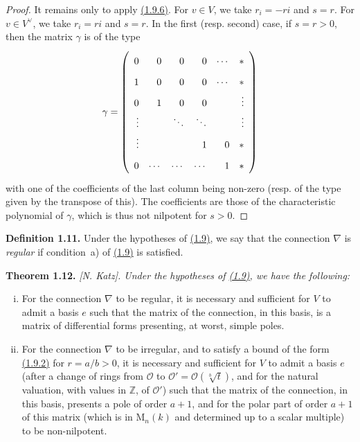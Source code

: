 \documentclass{report}
\newenvironment{itenv}[1]
  {\phantomsection\par\medskip\noindent\textbf{#1.}\itshape}
  {\par\medskip}
\newenvironment{rmenv}[1]
  {\phantomsection\par\medskip\noindent\textbf{#1.}\rmfamily}
  {\par\medskip}
\renewcommand{\cal}[1]{{\mathcal{#1}}}
\newcommand{\ZZ}{\mathbb{Z}}
\newcommand{\MM}{\mathrm{M}}
\newcommand{\oldpage}[1]{\marginpar{\footnotesize$\Big\vert$ \textit{p.~#1}}}
\begin{document}
\begin{proof}
  It remains only to apply \hyperref[II.1.9.6]{(1.9.6)}.
  For $v\in V$, we take $r_i=-ri$ and $s=r$.
  For $v\in V^\vee$, we take $r_i=ri$ and $s=r$.
  In the first (resp. second) case, if $s=r>0$, then the matrix $\gamma$ is of the type
  \[
    \gamma =
    \left(
      \def\arraystretch{1.8}
      \begin{array}{rrrrrr}
        0 & 0 & 0 & 0 & \cdots & *
      \\1 & 0 & 0 & 0 & \cdots & *
      \\0 & 1 & 0 & 0 & & \vdots
      \\\vdots & & \ddots & \ddots & & \vdots
      \\\vdots & & & 1 & 0 & *
      \\0 & \cdots & \cdots & \cdots & 1 & *
      \end{array}
    \right)
  \]
  with one of the coefficients of the last column being non-zero (resp. of the type given by the transpose of this).
  The coefficients are those of the characteristic polynomial of $\gamma$, which is thus not nilpotent for $s>0$.
\end{proof}

\begin{rmenv}{Definition 1.11}
\label{II.1.11}
  Under the hypotheses of \hyperref[II.1.9]{(1.9)}, we say that the connection $\nabla$ is \emph{regular} if condition~a) of \hyperref[II.1.9]{(1.9)} is satisfied.
\end{rmenv}

\begin{itenv}{Theorem 1.12}
\label{II.1.12}
  \emph{[N. Katz].}
  Under the hypotheses of \hyperref[II.1.9]{(1.9)}, we have the following:
  \begin{enumerate}[(i)]
    \item For the connection $\nabla$ to be regular, it is necessary and sufficient for $V$ to admit
\oldpage{51}
      a basis $e$ such that the matrix of the connection, in this basis, is a matrix of differential forms presenting, at worst, simple poles.
    \item For the connection $\nabla$ to be irregular, and to satisfy a bound of the form \hyperref[II.1.9.2]{(1.9.2)} for $r=a/b>0$, it is necessary and sufficient for $V$ to admit a basis $e$ (after a change of rings from $\cal{O}$ to $\cal{O}'=\cal{O}(\sqrt[b]{t})$, and for the natural valuation, with values in $\ZZ$, of $\cal{O}'$) such that the matrix of the connection, in this basis, presents a pole of order $a+1$, and for the polar part of order $a+1$ of this matrix (which is in $\MM_n(k)$ and determined up to a scalar multiple) to be non-nilpotent.
  \end{enumerate}
\end{itenv}
\end{document}
